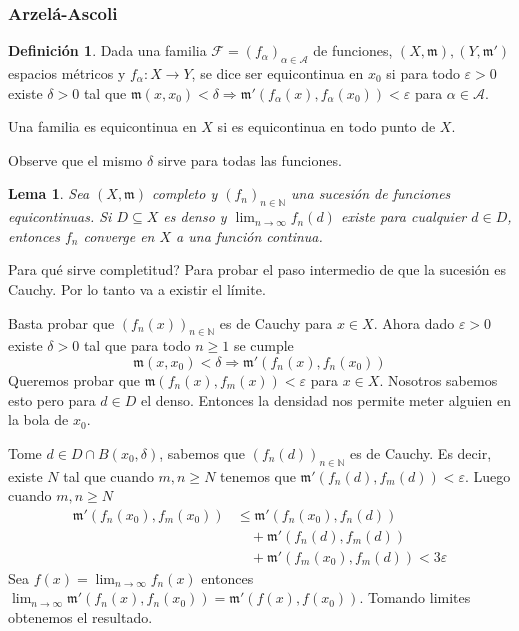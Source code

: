 \documentclass[12pt]{article}
\theoremstyle{plain}
\newtheorem{Lem}[Th]{Lema}             %
\theoremstyle{definition}
\newtheorem{Def}[Th]{Definición}       %
\theoremstyle{remark}
\numberwithin{equation}{section}
\newcommand{\bN}{\mathbb{N}}        %
\newcommand{\cF}{\mathcal{F}}       %
\newcommand{\cA}{\mathcal{A}}       %
\newcommand{\mm}{\mathfrak{m}}      %
\renewcommand{\geq}{\geqslant}      %
\renewcommand{\leq}{\leqslant}      %
\renewcommand{\:}{\colon}           %
\begin{document}
\begin{multicols}{2}
\subsubsection*{Arzelá-Ascoli}


\begin{Def}
  Dada una familia $\cF=(f_\alpha)_{\alpha\in\cA}$ de funciones, $(X,\mm),(Y,\mm')$ espacios métricos y $f_\alpha\colon X\to Y$, se dice ser equicontinua en $x_0$ si para todo $\varepsilon >0$ existe $\delta>0$ tal que $\mm(x,x_0)<\delta\Rightarrow\mm'(f_\alpha(x),f_\alpha(x_0))<\varepsilon$ para $\alpha\in\cA$.\par
  Una familia es equicontinua en $X$ si es equicontinua en todo punto de $X$.
\end{Def}

Observe que el mismo $\delta$ sirve para todas las funciones.

\begin{Lem}
  Sea $(X,\mm)$ completo y $(f_n)_{n\in\bN}$ una sucesión de funciones equicontinuas. Si $D\subseteq X$ es denso y $\lim_{n\to\infty}f_n(d)$ existe para cualquier $d\in D$, entonces $f_n$ converge en $X$ a una función continua.
\end{Lem}

Para qué sirve completitud? Para probar el paso intermedio de que la sucesión es Cauchy. Por lo tanto va a existir el límite.
\begin{ptcbp}
Basta probar que $(f_n(x))_{n\in\bN}$ es de Cauchy para $x\in X$. Ahora dado $\varepsilon>0$ existe $\delta>0$ tal que para todo $n\geq 1$ se cumple
$$\mm(x,x_0)<\delta\Rightarrow\mm'(f_n(x),f_n(x_0))$$
Queremos probar que $\mm(f_n(x),f_m(x))<\varepsilon$ para $x\in X$. Nosotros sabemos esto pero para $d\in D$ el denso. Entonces la densidad nos permite meter alguien en la bola de $x_0$.\par
Tome $d\in D\cap B(x_0,\delta)$, sabemos que $(f_n(d))_{n\in\bN}$ es de Cauchy. Es decir, existe $N$ tal que cuando $m,n\geq N$ tenemos que $\mm'(f_n(d),f_m(d))<\varepsilon$. Luego cuando $m,n\geq N$
\begin{align*}
  \mm'(f_n(x_0),f_m(x_0)) &\leq \mm'(f_n(x_0),f_n(d)) \\
                         &\quad+\mm'(f_n(d),f_m(d))\\
                         &\quad+\mm'(f_m(x_0),f_m(d))<3\varepsilon
\end{align*}
Sea $f(x)=\lim_{n\to\infty}f_n(x)$ entonces $\lim_{n\to\infty}\mm'(f_n(x),f_n(x_0))=\mm'(f(x),f(x_0))$. Tomando limites obtenemos el resultado.
\end{ptcbp}


\end{multicols}
\end{document}
